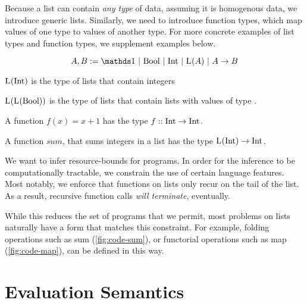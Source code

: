 Because a list can contain \emph{any type} of data, assuming it is homogenous data, we introduce generic lists. Similarly, we need to introduce function types, which map values of one type to values of another type. For more concrete examples of list types and function types, we supplement examples below.

\begin{definition}\label{def:type-system-6}
   \[
      A, B := \unit~|~\text{\bool}~|~\text{\typeint}~|~\ralist{}{A}~|~\rafunc{A}{B}{}{}
   \]
\end{definition}

\begin{example}
   \(\text{L}^{}(\text{Int})\) is the type of lists that contain integers
\end{example}

\begin{example}
   \(\text{L}^{}(\text{L}^{}(\text{Bool}))\) is the type of lists that contain lists with values of type \bool.
\end{example}

\begin{example}
   A function \(f(x) = x+1\) has the type \(f :: \text{Int} \to \text{Int} ^{}_{}\).
\end{example}

\begin{example}
   A function \(sum\), that sums integers in a list has the type \(\text{L}^{}(\text{Int}) \to \text{Int} ^{}_{}\).
\end{example}

We want to infer resource-bounds for programs. In order for the inference to be computationally tractable, we constrain the use of certain language features. Most notably, we enforce that functions on lists only recur on the tail of the list. As a result, recursive function calls \emph{will terminate}, eventually.

While this reduces the set of programs that we permit, most problems on lists naturally have a form that matches this constraint. For example, folding operations such as sum (\cref{fig:code-sum}), or functorial operations such as map (\cref{fig:code-map}), can be defined in this way. 

\section{Evaluation Semantics}

